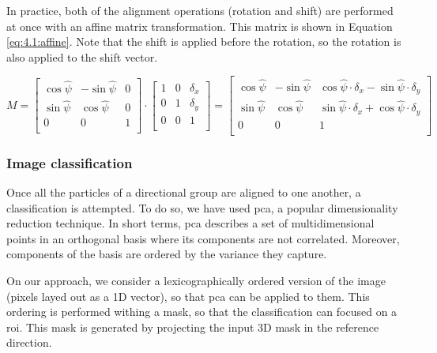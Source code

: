 \documentclass[../main.tex]{subfiles}
\begin{document}
In practice, both of the alignment operations (rotation and shift) are performed at once with an affine matrix transformation. This matrix is shown in Equation \eqref{eq:4.1:affine}. Note that the shift is applied before the rotation, so the rotation is also applied to the shift vector.

\begin{equation}\label{eq:4.1:affine}
    M =
    \begin{bmatrix}
        \cos \hat{\psi} & -\sin \hat{\psi} & 0\\
        \sin \hat{\psi} & \cos \hat{\psi} & 0\\
        0 & 0 & 1\\
    \end{bmatrix}
    \cdot
    \begin{bmatrix}
        1 & 0 & \delta_x\\
        0 & 1 & \delta_y\\
        0 & 0 & 1\\
    \end{bmatrix}
    =
    \begin{bmatrix}
        \cos \hat{\psi} & -\sin \hat{\psi} & \cos \hat{\psi} \cdot \delta_x - \sin \hat{\psi} \cdot \delta_y\\
        \sin \hat{\psi} & \cos \hat{\psi} & \sin \hat{\psi} \cdot \delta_x + \cos \hat{\psi} \cdot \delta_y\\
        0 & 0 & 1\\
    \end{bmatrix}
\end{equation}

\subsubsection{Image classification}
Once all the particles of a directional group are aligned to one another, a classification is attempted. To do so, we have used \gls{pca}, a popular dimensionality reduction technique\cite{kurita2019}. In short terms, \gls{pca} describes a set of multidimensional points in an orthogonal basis where its components are not correlated. Moreover, components of the basis are ordered by the variance they capture\cite{karamizadeh2013}.

On our approach, we consider a lexicographically ordered version of the image (pixels layed out as a 1D vector), so that \gls{pca} can be applied to them. This ordering is performed withing a mask, so that the classification can focused on a \gls{roi}. This mask is generated by projecting the input 3D mask in the reference direction.
\end{document}
